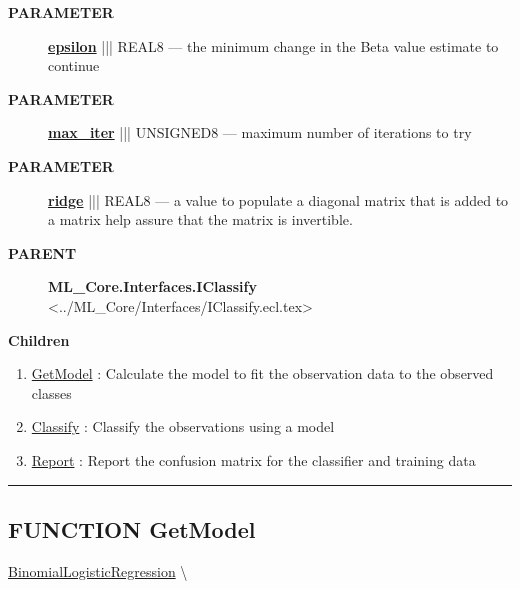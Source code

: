 \par
\begin{description}
\item [\colorbox{tagtype}{\color{white} \textbf{\textsf{PARAMETER}}}] \textbf{\underline{epsilon}} ||| REAL8 --- the minimum change in the Beta value estimate to continue
\item [\colorbox{tagtype}{\color{white} \textbf{\textsf{PARAMETER}}}] \textbf{\underline{max\_iter}} ||| UNSIGNED8 --- maximum number of iterations to try
\item [\colorbox{tagtype}{\color{white} \textbf{\textsf{PARAMETER}}}] \textbf{\underline{ridge}} ||| REAL8 --- a value to populate a diagonal matrix that is added to a matrix help assure that the matrix is invertible.
\end{description}









\par
\begin{description}
\item [\colorbox{tagtype}{\color{white} \textbf{\textsf{PARENT}}}] \textbf{ML\_Core.Interfaces.IClassify} <../ML\_Core/Interfaces/IClassify.ecl.tex>
\end{description}


\textbf{Children}
\begin{enumerate}
\item \hyperlink{ecldoc:logisticregression.binomiallogisticregression.getmodel}{GetModel}
: Calculate the model to fit the observation data to the observed classes
\item \hyperlink{ecldoc:logisticregression.binomiallogisticregression.classify}{Classify}
: Classify the observations using a model
\item \hyperlink{ecldoc:logisticregression.binomiallogisticregression.report}{Report}
: Report the confusion matrix for the classifier and training data
\end{enumerate}

\rule{\linewidth}{0.5pt}

\subsection*{\textsf{\colorbox{headtoc}{\color{white} FUNCTION}
GetModel}}

\hypertarget{ecldoc:logisticregression.binomiallogisticregression.getmodel}{}
\hspace{0pt} \hyperlink{ecldoc:logisticregression.binomiallogisticregression}{BinomialLogisticRegression} \textbackslash 

